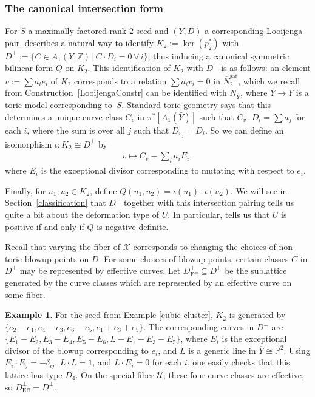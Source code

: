 \documentclass[11pt]{article}
\numberwithin{equation}{section}
\numberwithin{figure}{section}
\numberwithin{table}{section}
\DeclareMathOperator{\Eff}{Eff}
\DeclareMathOperator{\sat}{sat}
\let\?=\overline
\let\bb=\mathbb
\let\rar=\rightarrow
\let\s=\mathcal
\theoremstyle{definition}
\newtheorem{eg}[thm]{Example}
\begin{document}
\subsubsection{The canonical intersection form}\label{canonical intersection}

For $S$ a maximally factored rank $2$ seed and $(Y,D)$ a corresponding Looijenga pair, \cite{GHK3} describes a natural way to identify $K_2:=\ker(p_2^*)$ with $D^{\perp}:=\{C\in A_1(Y,\bb{Z})\,|\,C\cdot D_i =0 \,\forall\,i\}$, thus inducing a canonical symmetric bilinear form $Q$ on $K_2$. This identification of $K_2$ with $D^{\perp}$ is as follows: an element $v:=\sum a_i e_i$ of $K_2$ corresponds to a relation $\sum a_{i} v_i = 0$ in $\?{N}_2^{\sat}$, which we recall from Construction~\ref{LooijengaConstr} can be identified with $N_{\?{Y}}$, where $Y\rar \?{Y}$ is a toric model corresponding to~$S$. Standard toric geometry says that this determines a unique curve class $C_v$ in $\pi^{*}[A_1(\bar{Y})]$ such that $C_v\cdot D_i = \sum a_{j}$ for each $i$, where the sum is over all $j$ such that $D_{v_j}=D_i$. So we can define an isomorphism $\iota\colon K_2 \cong D^{\perp}$ by
\begin{gather*}
	v\mapsto C_v - \sum_i a_{i} E_{i},
\end{gather*}
where $E_i$ is the exceptional divisor corresponding to mutating with respect to $e_i$.

Finally, for $u_1,u_2 \in K_2$, define $Q(u_1,u_2) = \iota(u_1) \cdot \iota(u_2)$. We will see in Section~\ref{classification} that $D^{\perp}$ together with this intersection pairing tells us quite a bit about the deformation type of $U$. In particular, \cite{GHK3} tells us that $U$ is positive if and only if $Q$ is negative definite.

Recall that varying the fiber of $\s{X}$ corresponds to changing the choices of non-toric blowup points on $D$. For some choices of blowup points, certain classes $C$ in $D^{\perp}$ may be represented by effective curves. Let $D^{\perp}_{\Eff} \subseteq D^{\perp}$ be the sublattice generated by the curve classes which are represented by an effective curve on some fiber.

\begin{eg}For the seed from Example \ref{cubic cluster}, $K_2$ is generated by $\{e_2-e_1,e_4-e_3,e_6-e_5,e_1+e_3+e_5\}$. The corresponding curves in $D^{\perp}$ are $\{E_1-E_2,E_3-E_4,E_5-E_6,L-E_1-E_3-E_5\}$, where $E_i$ is the exceptional divisor of the blowup corresponding to $e_i$, and $L$ is a generic line in $\?{Y}\cong \bb{P}^2$. Using $E_i\cdot E_j = -\delta_{ij}$, $L\cdot L=1$, and $L\cdot E_i=0$ for each $i$, one easily checks that this lattice has type $D_4$. On the special fiber $\s{U}$, these four curve classes are effective, so $D^{\perp}_{\Eff} = D^{\perp}$.
\end{eg}
\end{document}

